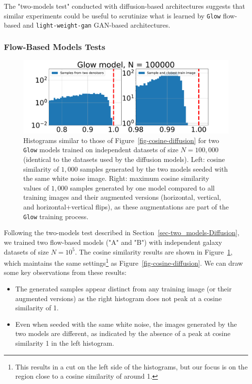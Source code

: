 \documentclass[fleqn,usenatbib]{mnras}
\begin{document}
The "two-models test" conducted with diffusion-based architectures suggests that similar experiments could be useful to scrutinize what is learned by \texttt{Glow} flow-based and \texttt{light-weight-gan} GAN-based architectures.
%
\subsubsection{Flow-Based Models Tests}
\label{sec-two_models-Flow}
%
\begin{figure}
    \centering
    \includegraphics[width=\linewidth]{fig-glow-cosine-AB_ATrain.pdf}
    \caption{Histograms similar to those of Figure~\ref{fig-cosine-diffusion} for two \texttt{Glow} models trained on independent datasets of size $N=100,000$ (identical to the datasets used by the diffusion models). 
    Left: cosine similarity of $1,000$ samples generated by the two models seeded with the same white noise image. 
    Right: maximum cosine similarity values of $1,000$ samples generated by one model compared to all training images and their augmented versions (horizontal, vertical, and horizontal+vertical flips), as these augmentations are part of the \texttt{Glow} training process.}
    \label{fig-cosine-glow}
\end{figure}

Following the two-models test described in Section~\ref{sec-two_models-Diffusion}, we trained two flow-based models ("A" and "B") with independent galaxy datasets of size $N=10^5$. The cosine similarity results are shown in Figure~\ref{fig-cosine-glow}, {\color{red} which maintains the same settings\footnote{This results in a cut on the left side of the histograms, but our focus is on the region close to a cosine similarity of around 1.} as Figure~\ref{fig-cosine-diffusion}}. We can draw some key observations from these results:
\begin{itemize}
    \item The generated samples appear distinct from any training image (or their augmented versions) as the right histogram does not peak at a cosine similarity of 1. 
    \item Even when seeded with the same white noise, the images generated by the two models are different, as indicated by the absence of a peak at cosine similarity 1 in the left histogram.
\end{itemize}
\end{document}
